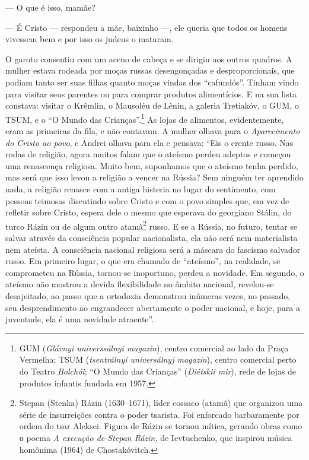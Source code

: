 --- O que é isso, mamãe?

--- É Cristo --- respondeu a mãe, baixinho ---, ele queria que todos os
homens vivessem bem e por isso os judeus o mataram.

O garoto consentiu com um aceno de cabeça e se dirigiu aos outros
quadros. A mulher estava rodeada por moças russas desengonçadas e
desproporcionais, que podiam tanto ser suas filhas quanto moças vindas
dos ``cafundós''. Tinham vindo para visitar seus parentes ou para
comprar produtos alimentícios. E na sua lista constava: visitar o
Krêmlin, o Mausoléu de Lênin, a galeria Tretiakóv, o GUM, o TSUM, e o
``O Mundo das Crianças''.\footnote{GUM (\emph{Glávnyi universsálnyi
  magazin}), centro comercial ao lado da Praça Vermelha; TSUM
  (\emph{tsentrálnyi universálnyj magazin}), centro comercial perto do
  Teatro \emph{Bolchói}; ``O Mundo das Crianças'' (\emph{Diétskii mir}),
  rede de lojas de produtos infantis fundada em 1957.} As lojas de
alimentos, evidentemente, eram as primeiras da fila, e não contavam. A
mulher olhava para o \emph{Aparecimento do Cristo ao povo}, e Andrei
olhava para ela e pensava: ``Eis o crente russo. Nas rodas de religião,
agora muitos falam que o ateísmo perdeu adeptos e começou uma renascença
religiosa. Muito bem, suponhamos que o ateísmo tenha perdido, mas será
que isso levou a religião a vencer na Rússia? Sem ninguém ter aprendido
nada, a religião renasce com a antiga histeria no lugar do sentimento,
com pessoas teimosas discutindo sobre Cristo e com o povo simples que,
em vez de refletir sobre Cristo, espera dele o mesmo que esperava do
georgiano Stálin, do turco Rázin ou de algum outro atamã\footnote{Stepan
  (Stenka) Rázin (1630\emph{--}1671), líder cossaco (atamã) que
  organizou uma série de insurreições contra o poder tsarista. Foi
  enforcado barbaramente por ordem do tsar Aleksei. Figura de Rázin se
  tornou mítica, gerando obras como о poema \emph{A execução de Stepan
  Rázin,} de Ievtuchenko, que inspirou música homônima (1964) de
  Chostakóvitch.} russo. E se a Rússia, no futuro, tentar se salvar
através da consciência popular nacionalista, ela não será nem
materialista nem ateísta. A consciência nacional religiosa será a
máscara do fascismo salvador russo. Em primeiro lugar, o que era chamado
de ``ateísmo'', na realidade, se comprometeu na Rússia, tornou-se
inoportuno, perdeu a novidade. Em segundo, o ateísmo não mostrou a
devida flexibilidade no âmbito nacional, revelou-se desajeitado, ao
passo que a ortodoxia demonstrou inúmeras vezes, no passado, seu
desprendimento ao engrandecer abertamente o poder nacional, e hoje, para
a juventude, ela é uma novidade atraente''.

